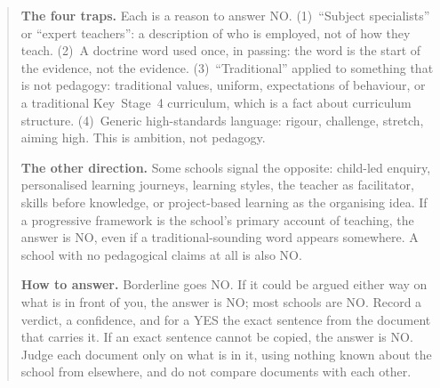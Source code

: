\begin{quote}
\textbf{The four traps.} Each is a reason to answer NO.
(1)~``Subject specialists'' or ``expert teachers'': a description of who is
employed, not of how they teach.
(2)~A doctrine word used once, in passing: the word is the start of the
evidence, not the evidence.
(3)~``Traditional'' applied to something that is not pedagogy: traditional
values, uniform, expectations of behaviour, or a traditional Key~Stage~4
curriculum, which is a fact about curriculum structure.
(4)~Generic high-standards language: rigour, challenge, stretch, aiming high.
This is ambition, not pedagogy.

\textbf{The other direction.} Some schools signal the opposite: child-led
enquiry, personalised learning journeys, learning styles, the teacher as
facilitator, skills before knowledge, or project-based learning as the
organising idea. If a progressive framework is the school's primary account of
teaching, the answer is NO, even if a traditional-sounding word appears
somewhere. A school with no pedagogical claims at all is also NO.

\textbf{How to answer.} Borderline goes NO. If it could be argued either way on
what is in front of you, the answer is NO; most schools are NO. Record a
verdict, a confidence, and for a YES the exact sentence from the document that
carries it. If an exact sentence cannot be copied, the answer is NO. Judge each
document only on what is in it, using nothing known about the school from
elsewhere, and do not compare documents with each other.

\end{quote}
